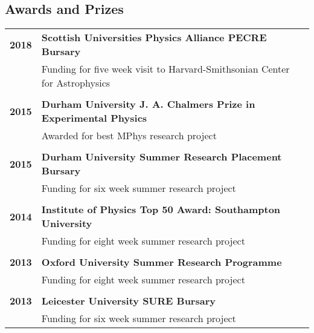 \documentclass[a4paper,fleqn,usenatbib,onecolumn]{mnras}
\begin{document}
\subsection*{Awards and Prizes}
\begingroup
\setlength{\tabcolsep}{0pt} %
\renewcommand{\arraystretch}{1.05} %
\begin{longtable}{ p{2cm} p{15cm} }

\bf{2018} & \bf{Scottish Universities Physics Alliance PECRE Bursary}\\
&  Funding for five week visit to Harvard-Smithsonian Center for Astrophysics\\
\\
\bf{2015} & \bf{Durham University J. A. Chalmers Prize in Experimental Physics}\\
& Awarded for best MPhys research project\\

\\

\bf{2015} & \bf{Durham University Summer Research Placement Bursary}\\
& Funding for six week summer research project \\

\\

\bf{2014} & \bf{Institute of Physics Top 50 Award: Southampton University}\\
& Funding for eight week summer research project\\

\\

\bf{2013} & \bf{Oxford University Summer Research Programme}\\
& Funding for eight week summer research project\\

\\

\bf{2013} & \bf{Leicester University SURE Bursary}\\
& Funding for six week summer research project\\

\end{longtable}
\endgroup
\end{document}
